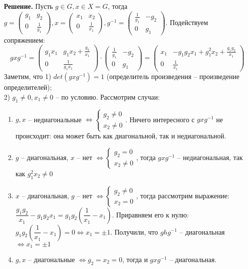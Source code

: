 \documentclass[a4paper, 12pt]{article}
\begin{document}
\begin{spacing}{1}
\noindent \textbf{Решение.} Пусть $g \in G, x \in X = G$, тогда $g = \begin{pmatrix}
g_1 & g_2\\
0 & \frac{1}{g_1}
\end{pmatrix}, x = \begin{pmatrix}
x_1 & x_2\\
0 & \frac{1}{x_1}
\end{pmatrix}, g^{-1} = \begin{pmatrix}
\frac{1}{g_1} &  -g_2\\
0 & g_1
\end{pmatrix}
$. Подействуем сопряжением:
$$
gxg^{-1} = \begin{pmatrix}
g_1x_1 & g_1x_2 + \frac{g_2}{x_1}\\
0 & \frac{1}{g_1x_1}
\end{pmatrix}\cdot \begin{pmatrix}
\frac{1}{g_1} &  -g_2\\
0 & g_1
\end{pmatrix} = \begin{pmatrix}
x_1 & -g_1g_2x_1 + g_1^2x_2 + \frac{g_1g_2}{x_1}\\
0 & \frac{1}{x_1}
\end{pmatrix}
$$
Заметим, что 1) $det(gxg^{-1}) = 1$ (определитель произведения -- произведение определителей);\\ 2) $g_1\neq 0, x_1\neq 0$ -- по условию. Рассмотрим случаи:
\begin{enumerate}
	\item $g, x$ -- недиагональные $\Leftrightarrow \begin{cases}
	g_2 \neq 0\\
	x_2 \neq 0
	\end{cases}$. Ничего интересного с $gxg^{-1}$ не происходит: она может быть как диагональной, так и недиагональной.
	\item $g$ -- диагональная, $x$ -- нет $\Leftrightarrow \begin{cases}
	g_2 = 0\\
	x_2 \neq 0
	\end{cases}$, тогда $gxg^{-1}$ -- недиагональная, так как $g_1^2x_2 \neq 0$
	\item $x$ -- диагональная, $g$ -- нет $\Leftrightarrow \begin{cases}
	g_2 \neq 0\\
	x_2 = 0
	\end{cases}$, тогда рассмотрим выражение:\\
	 $\dfrac{g_1g_2}{x_1} - g_1g_2x_1 = g_1g_2(\dfrac{1}{x_1} - x_1)$. Приравняем его к нулю: $g_1g_2(\dfrac{1}{x_1} - x_1) = 0\Leftrightarrow x_1 = \pm1$. Получили, что $ghg^{-1}$ -- диагональная$\Leftrightarrow x_1 = \pm1$
	 \item $g,x$ -- диагональные $\Leftrightarrow g_2=x_2=0$, тогда и $gxg^{-1}$ -- диагональная.
\end{enumerate}









\end{spacing}
\end{document}
